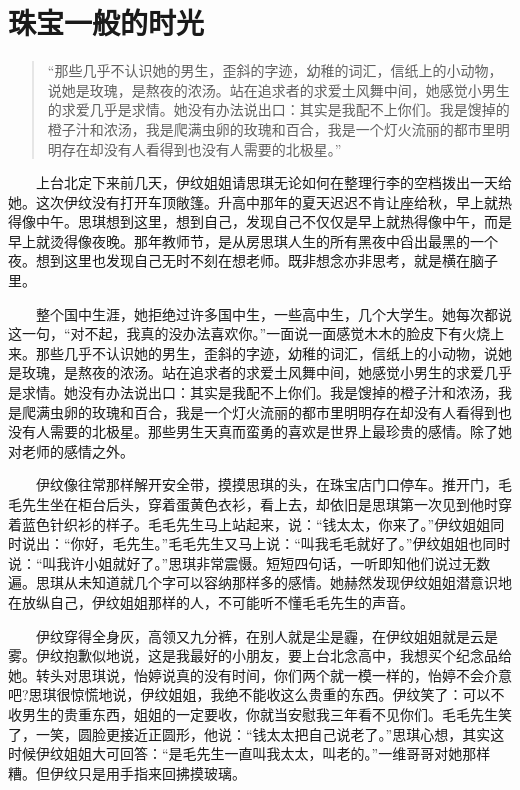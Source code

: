 \documentclass[12pt,UTF8]{ctexbook}
\begin{document}
\hypertarget{ux73e0ux5b9dux4e00ux822cux7684ux65f6ux5149}{%
\section*{珠宝一般的时光}\label{ux73e0ux5b9dux4e00ux822cux7684ux65f6ux5149}}

\begin{quote}
\enquote{那些几乎不认识她的男生，歪斜的字迹，幼稚的词汇，信纸上的小动物，说她是玫瑰，是熬夜的浓汤。站在追求者的求爱土风舞中间，她感觉小男生的求爱几乎是求情。她没有办法说出口：其实是我配不上你们。我是馊掉的橙子汁和浓汤，我是爬满虫卵的玫瑰和百合，我是一个灯火流丽的都市里明明存在却没有人看得到也没有人需要的北极星。}
\end{quote}

　　上台北定下来前几天，伊纹姐姐请思琪无论如何在整理行李的空档拨出一天给她。这次伊纹没有打开车顶敞篷。升高中那年的夏天迟迟不肯让座给秋，早上就热得像中午。思琪想到这里，想到自己，发现自己不仅仅是早上就热得像中午，而是早上就烫得像夜晚。那年教师节，是从房思琪人生的所有黑夜中舀出最黑的一个夜。想到这里也发现自己无时不刻在想老师。既非想念亦非思考，就是横在脑子里。

　　整个国中生涯，她拒绝过许多国中生，一些高中生，几个大学生。她每次都说这一句，\enquote{对不起，我真的没办法喜欢你。}一面说一面感觉木木的脸皮下有火烧上来。那些几乎不认识她的男生，歪斜的字迹，幼稚的词汇，信纸上的小动物，说她是玫瑰，是熬夜的浓汤。站在追求者的求爱土风舞中间，她感觉小男生的求爱几乎是求情。她没有办法说出口：其实是我配不上你们。我是馊掉的橙子汁和浓汤，我是爬满虫卵的玫瑰和百合，我是一个灯火流丽的都市里明明存在却没有人看得到也没有人需要的北极星。那些男生天真而蛮勇的喜欢是世界上最珍贵的感情。除了她对老师的感情之外。

　　伊纹像往常那样解开安全带，摸摸思琪的头，在珠宝店门口停车。推开门，毛毛先生坐在柜台后头，穿着蛋黄色衣衫，看上去，却依旧是思琪第一次见到他时穿着蓝色针织衫的样子。毛毛先生马上站起来，说：\enquote{钱太太，你来了。}伊纹姐姐同时说出：\enquote{你好，毛先生。}毛毛先生又马上说：\enquote{叫我毛毛就好了。}伊纹姐姐也同时说：\enquote{叫我许小姐就好了。}思琪非常震慑。短短四句话，一听即知他们说过无数遍。思琪从未知道就几个字可以容纳那样多的感情。她赫然发现伊纹姐姐潜意识地在放纵自己，伊纹姐姐那样的人，不可能听不懂毛毛先生的声音。

　　伊纹穿得全身灰，高领又九分裤，在别人就是尘是霾，在伊纹姐姐就是云是雾。伊纹抱歉似地说，这是我最好的小朋友，要上台北念高中，我想买个纪念品给她。转头对思琪说，怡婷说真的没有时间，你们两个就一模一样的，怡婷不会介意吧?思琪很惊慌地说，伊纹姐姐，我绝不能收这么贵重的东西。伊纹笑了：可以不收男生的贵重东西，姐姐的一定要收，你就当安慰我三年看不见你们。毛毛先生笑了，一笑，圆脸更接近正圆形，他说：\enquote{钱太太把自己说老了。}思琪心想，其实这时候伊纹姐姐大可回答：\enquote{是毛先生一直叫我太太，叫老的。}一维哥哥对她那样糟。但伊纹只是用手指来回拂摸玻璃。
\end{document}
